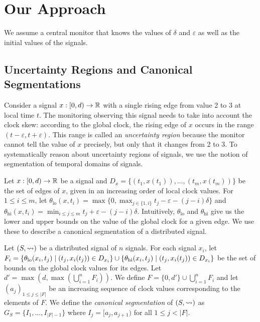 \section{Our Approach}
We assume a central monitor that knows the values of $\delta$ and $\varepsilon$ as well as the initial values of the signals.

\subsection{Uncertainty Regions and Canonical Segmentations} \label{sec:segment}

Consider a signal $x : [0,d) \to \mathbb{R}$ with a single rising edge from value 2 to 3 at local time $t$.
The monitoring observing this signal needs to take into account the clock skew: according to the global clock, the rising edge of $x$ occurs in the range $(t - \varepsilon, t + \varepsilon)$.
This range is called an \emph{uncertainty region} because the monitor cannot tell the value of $x$ precisely, but only that it changes from 2 to 3.
To systematically reason about uncertainty regions of signals, we use the notion of segmentation of temporal domains of signals.

Let $x : [0,d) \to \mathbb{R}$ be a signal and $D_x = \{(t_1, x(t_1)), \ldots, (t_m, x(t_m))\}$ be the set of edges of $x$, given in an increasing order of local clock values.
For $1 \leq i \leq m$, let $\theta_{\text{lo}}(x,t_i) = \max\{0, \max_{j \in \{1, i\}} t_j - \varepsilon - (j-i)\delta\}$ and $\theta_{\text{hi}}(x,t_i) = \min_{i \leq j \leq m} t_j + \varepsilon - (j-i)\delta$.
Intuitively, $\theta_{\text{lo}}$ and $\theta_{\text{hi}}$ give us the lower and upper bounds on the value of the global clock for a given edge.
We use these to describe a canonical segmentation of a distributed signal.

Let $(S,{\rightsquigarrow})$ be a distributed signal of $n$ signals.
For each signal $x_i$, let $F_i = \{\theta_{\text{lo}}(x_i, t_j) \st (t_j, x_i(t_j)) \in D_{x_i}\} \cup \{\theta_{\text{hi}}(x_i, t_j) \st (t_j, x_i(t_j)) \in D_{x_i}\}$ be the set of bounds on the global clock values for its edges.
Let $d' = \max(d, \max (\bigcup_{i = 1}^{n} F_i))$. %
We define $F = \{0, d'\} \cup \bigcup_{i = 1}^{n} F_i$ and let $(a_j)_{1 \leq j \leq |F|}$ be an increasing sequence of clock values corresponding to the elements of $F$.
We define the \emph{canonical segmentation} of $(S,{\rightsquigarrow})$ as $G_S = \{I_1, \ldots, I_{|F| - 1}\}$ where $I_j = [a_j, a_{j+1})$ for all $1 \leq j < |F|$.

